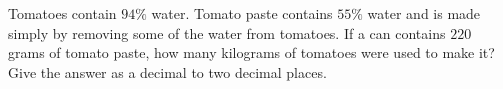 Tomatoes contain $94\%$ water. Tomato paste contains $55\%$ water and is made simply by removing some of the water from tomatoes. If a can contains $220$ grams of tomato paste, how many kilograms of tomatoes were used to make it? Give the answer as a decimal to two decimal places.
